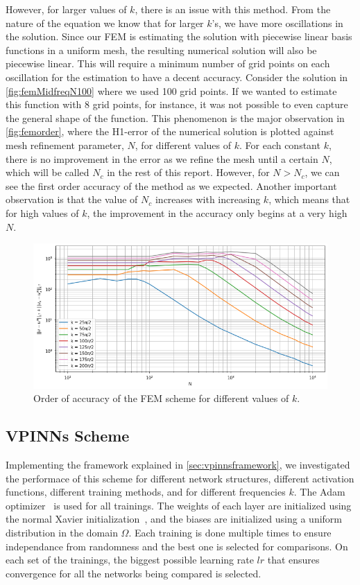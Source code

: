 However, for larger values of $k$, there is an issue with this method. From the nature of the equation we know that for larger $k$'s, we have more oscillations in the solution. Since our FEM is estimating the solution with piecewise linear basis functions in a uniform mesh, the resulting numerical solution will also be piecewise linear. This will require a minimum number of grid points on each oscillation for the estimation to have a decent accuracy. Consider the solution in \autoref{fig:femMidfreqN100} where we used 100 grid points. If we wanted to estimate this function with 8 grid points, for instance, it was not possible to even capture the general shape of the function. This phenomenon is the major observation in \autoref{fig:femorder}, where the H1-error of the numerical solution is plotted against mesh refinement parameter, $N$, for different values of $k$. For each constant $k$, there is no improvement in the error as we refine the mesh until a certain $N$, which will be called $N_c$ in the rest of this report. However, for $N > N_c$, we can see the first order accuracy of the method as we expected. Another important observation is that the value of $N_c$ increases with increasing $k$, which means that for high values of $k$, the improvement in the accuracy only begins at a very high $N$.
\begin{figure}[h!]
    \centering
    \includegraphics[width=.7\textwidth]{img/FEM-Order-Homog-H1.png}
    \caption{Order of accuracy of the FEM scheme for different values of $k$.}
    \label{fig:femorder}
\end{figure}

\subsection{VPINNs Scheme}\label{sec:vpinnsresults}
Implementing the framework explained in \autoref{sec:vpinnsframework}, we investigated the performace of this scheme for different network structures, different activation functions, different training methods, and for different frequencies $k$. The Adam optimizer~\cite{adamoptimizer} is used for all trainings. The weights of each layer are initialized using the normal Xavier initialization~\cite{xavierinitialization}, and the biases are initialized using a uniform distribution in the domain $\Omega$. Each training is done multiple times to ensure independance from randomness and the best one is selected for comparisons. On each set of the trainings, the biggest possible learning rate $lr$ that ensures convergence for all the networks being compared is selected.

